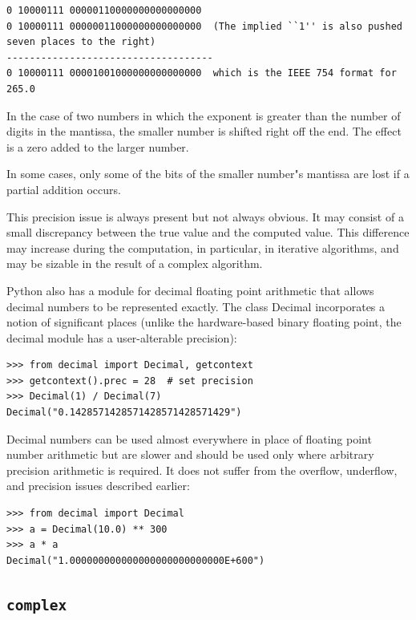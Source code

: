 \documentclass[justified, sixbynine]{tufte-book}
\def\ft{\small\tt}
\theoremstyle{plain}%
\newtheorem * {corollary}{Corollary}
\theoremstyle{definition}
\theoremstyle{remark}
\newtheorem * {remark}{Remark}
\newtheorem * {note}{Note}
\begin{document}
\begin{fullwidth}
\begin{lstlisting}
0 10000111 00000110000000000000000
0 10000111 00000011000000000000000  (The implied ``1'' is also pushed seven places to the right)
------------------------------------
0 10000111 00001001000000000000000  which is the IEEE 754 format for 265.0
\end{lstlisting}

In the case of two numbers in which the exponent is greater than the number of digits in the mantissa, the smaller number is shifted right off the end.  The effect is a zero added to the larger number.

In some cases, only some of the bits of the smaller number"s mantissa are lost if a partial addition occurs.

This precision issue is always present but not always obvious. It may consist of a small discrepancy between the true value and the computed value. This difference may increase during the computation, in particular, in iterative algorithms, and may be sizable in the result of a complex algorithm.

Python also has a module for  decimal floating point arithmetic that allows decimal numbers to be represented exactly. The class Decimal incorporates a notion of significant places (unlike the hardware-based binary floating point, the decimal module has a user-alterable precision):

\begin{lstlisting}
>>> from decimal import Decimal, getcontext
>>> getcontext().prec = 28  # set precision
>>> Decimal(1) / Decimal(7)
Decimal("0.1428571428571428571428571429")
\end{lstlisting}

Decimal numbers can be used almost everywhere in place of floating point number arithmetic but are slower and should be used only where arbitrary precision arithmetic is required. It does not suffer from the overflow, underflow, and precision issues described earlier:

\begin{lstlisting}
>>> from decimal import Decimal
>>> a = Decimal(10.0) ** 300
>>> a * a
Decimal("1.000000000000000000000000000E+600")
\end{lstlisting}

\goodbreak\subsection{{\ft complex}}


\end{fullwidth}
\end{document}
